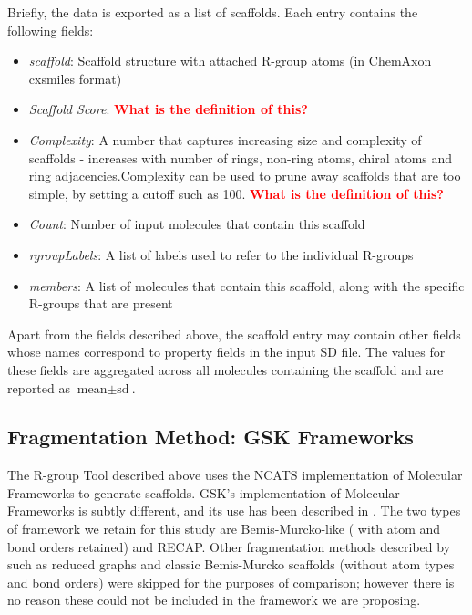 \documentclass[journal=jacsat,manuscript=article]{achemso}
\begin{document}
Briefly, the data is exported as a list of scaffolds. Each entry
contains the following fields:

\begin{itemize}
\item {\it scaffold}: Scaffold structure with attached R-group atoms
  (in ChemAxon cxsmiles format)
\item {\it Scaffold Score}: \textbf{\textcolor{red}{What is the
      definition of this?}}
\item {\it Complexity}: A number that captures increasing size and
  complexity of scaffolds - increases with number of rings, non-ring
  atoms, chiral atoms and ring adjacencies.Complexity can be used to
  prune away scaffolds that are too simple, by setting a cutoff such
  as 100.  \textbf{\textcolor{red}{What is the definition of this?}}
\item {\it Count}: Number of input molecules that contain this
  scaffold
\item {\it rgroupLabels}: A list of labels used to refer to the
  individual R-groups
\item {\it members}: A list of molecules that contain this scaffold,
  along with the specific R-groups that are present
\end{itemize}

Apart from the fields described above, the scaffold entry may contain
other fields whose names correspond to property fields in the input SD
file. The values for these fields are aggregated across all molecules
containing the scaffold and are reported as $\textrm{mean} \pm \textrm{sd}$.

\subsection{Fragmentation Method: GSK Frameworks}
\label{sec:gskframe}
The R-group Tool described above uses the NCATS implementation of Molecular Frameworks to generate scaffolds. GSK's implementation of Molecular Frameworks is subtly different, and its use has been described in \citeauthor{Harper2004DDclus}. The two types of framework we retain for this study are Bemis-Murcko-like (\cite{BemisMurcko1996} with atom and bond orders retained) and RECAP\cite{Lewell:1998aa}. Other fragmentation methods described by \citeauthor{Harper2004DDclus} such as reduced graphs and classic Bemis-Murcko scaffolds (without atom types and bond orders) were skipped for the purposes of comparison; however there is no reason these could not be included in the framework we are proposing.    
\end{document}
